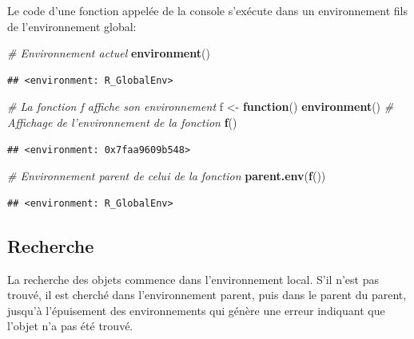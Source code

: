 \documentclass[
  12pt,
  french,
  a4paper,
  extrafontsizes,onecolumn,openright
  ]{memoir}
\newenvironment{Shaded}{\begin{snugshade}}{\end{snugshade}}
\newcommand{\CommentTok}[1]{\textcolor[rgb]{0.56,0.35,0.01}{\textit{#1}}}
\newcommand{\ControlFlowTok}[1]{\textcolor[rgb]{0.13,0.29,0.53}{\textbf{#1}}}
\newcommand{\KeywordTok}[1]{\textcolor[rgb]{0.13,0.29,0.53}{\textbf{#1}}}
\newcommand{\NormalTok}[1]{#1}
\newcommand{\StringTok}[1]{\textcolor[rgb]{0.31,0.60,0.02}{#1}}
\begin{document}
\normalsize

Le code d'une fonction appelée de la console s'exécute dans un environnement fils de l'environnement global:

\scriptsize

\begin{Shaded}
\begin{Highlighting}[]
\CommentTok{# Environnement actuel}
\KeywordTok{environment}\NormalTok{()}
\end{Highlighting}
\end{Shaded}

\begin{verbatim}
## <environment: R_GlobalEnv>
\end{verbatim}

\begin{Shaded}
\begin{Highlighting}[]
\CommentTok{# La fonction f affiche son environnement}
\NormalTok{f <-}\StringTok{ }\ControlFlowTok{function}\NormalTok{() }\KeywordTok{environment}\NormalTok{()}
\CommentTok{# Affichage de l'environnement de la fonction}
\KeywordTok{f}\NormalTok{()}
\end{Highlighting}
\end{Shaded}

\begin{verbatim}
## <environment: 0x7faa9609b548>
\end{verbatim}

\begin{Shaded}
\begin{Highlighting}[]
\CommentTok{# Environnement parent de celui de la fonction}
\KeywordTok{parent.env}\NormalTok{(}\KeywordTok{f}\NormalTok{())}
\end{Highlighting}
\end{Shaded}

\begin{verbatim}
## <environment: R_GlobalEnv>
\end{verbatim}

\normalsize

\hypertarget{recherche}{%
\subsection{Recherche}\label{recherche}}

La recherche des objets commence dans l'environnement local.
S'il n'est pas trouvé, il est cherché dans l'environnement parent, puis dans le parent du parent, jusqu'à l'épuisement des environnements qui génère une erreur indiquant que l'objet n'a pas été trouvé.
\end{document}
